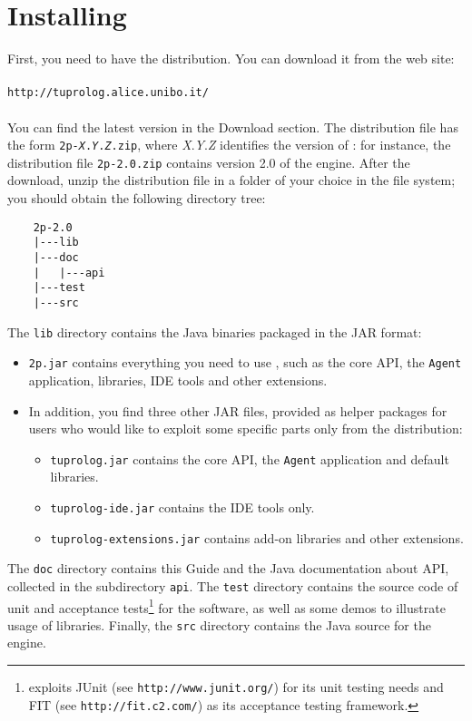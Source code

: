 \chapter{Installing \tuprolog{}}
\label{installation}

First, you need to have the \tuprolog{} distribution. You can download
it from the \tuprolog{} web site:\\\\
%
\texttt{http://tuprolog.alice.unibo.it/}\\\\
%
You can find the latest version in the \textsf{Download} section.
%
The distribution file has the form
\texttt{2p-\emph{X}.\emph{Y}.\emph{Z}.zip}, where
\emph{X}.\emph{Y}.\emph{Z} identifies the version of \tuprolog{}: for
instance, the distribution file \texttt{2p-2.0.zip} contains version
2.0 of the engine.
%
After the download, unzip the distribution file in a folder of
your choice in the file system;
%
you should obtain the following directory tree:
%
\begin{verbatim}
    2p-2.0
    |---lib
    |---doc
    |   |---api
    |---test
    |---src
\end{verbatim}
%
The \texttt{lib} directory contains the \tuprolog{} Java binaries
packaged in the JAR format:
%
\begin{itemize}
%
\item \texttt{2p.jar} contains everything you need to use \tuprolog{},
  such as the core API, the \texttt{Agent} application, libraries, IDE
  tools and other extensions.
%
\item In addition, you find three other JAR files, provided as helper
  packages for users who would like to exploit some specific parts
  only from the \tuprolog{} distribution:
  \begin{itemize}
    \item \texttt{tuprolog.jar} contains the core API, the
      \texttt{Agent} application and default libraries.
    \item \texttt{tuprolog-ide.jar} contains the IDE tools only.
    \item \texttt{tuprolog-extensions.jar} contains add-on libraries
    and other \tuprolog{} extensions.
  \end{itemize}
\end{itemize}
%
The \texttt{doc} directory contains this Guide and the Java documentation about \tuprolog{} API, collected in the subdirectory \texttt{api}.
%
The \texttt{test} directory contains the source code of unit and acceptance tests\footnote{\tuprolog{} exploits JUnit (see \texttt{http://www.junit.org/}) for its unit testing needs and FIT (see \texttt{http://fit.c2.com/}) as its acceptance testing framework.} for the software, as well as some demos to illustrate usage of libraries.
%
Finally, the \texttt{src} directory contains the Java source for
the \tuprolog{} engine.

